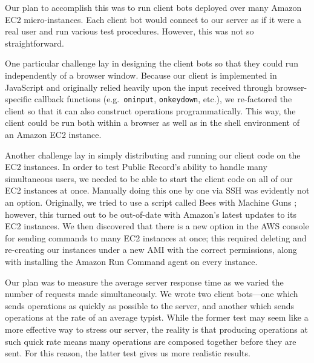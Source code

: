 \documentclass[letterpaper,11pt,twocolumn]{article}
\newcommand{\code}[1]{\texttt{\small #1}}
\begin{document}

Our plan to accomplish this was to run client bots deployed over many Amazon EC2 micro-instances.  Each client bot would connect to our server as if it were a real user and run various test procedures.  However, this was not so straightforward.

One particular challenge lay in designing the client bots so that they could run independently of a browser window.  Because our client is implemented in JavaScript and originally relied heavily upon the input received through browser-specific callback functions (e.g.\ \code{oninput}, \code{onkeydown}, etc.), we re-factored the client so that it can also construct operations programmatically.  This way, the client could be run both within a browser as well as in the shell environment of an Amazon EC2 instance.

\newcommand{\rednote}[1]{\textcolor{red}{#1}}

Another challenge lay in simply distributing and running our client code on the EC2 instances.  In order to test Public Record's ability to handle many simultaneous users, we needed to be able to start the client code on all of our EC2 instances at once.  Manually doing this one by one via SSH was evidently not an option.  Originally, we tried to use a script called Bees with Machine Guns \cite{Be}; however, this turned out to be out-of-date with Amazon's latest updates to its EC2 instances.  We then discovered that there is a new option in the AWS console for sending commands to many EC2 instances at once; this required deleting and re-creating our instances under a new AMI with the correct permissions, along with installing the Amazon Run Command agent on every instance.

Our plan was to measure the average server response time as we varied the number of requests made simultaneously.  We wrote two client bots---one which sends operations as quickly as possible to the server, and another which sends operations at the rate of an average typist.  While the former test may seem like a more effective way to stress our server, the reality is that producing operations at such quick rate means many operations are composed together before they are sent.  For this reason, the latter test gives us more realistic results.  
\end{document}
